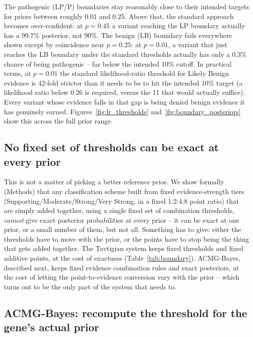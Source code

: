 \documentclass[11pt]{article}
\begin{document}
The pathogenic (LP/P) boundaries stay reasonably close to their intended
targets for priors between roughly 0.01 and 0.25. Above that, the standard
approach becomes over-confident: at $p=0.45$ a variant reaching the LP
boundary actually has a 99.7\% posterior, not 90\%. The benign (LB)
boundary fails everywhere shown except by coincidence near $p=0.25$: at
$p=0.01$, a variant that just reaches the LB boundary under the standard
thresholds actually has only a 0.3\% chance of being pathogenic -- far
below the intended 10\% cutoff. In practical terms, at $p=0.01$ the
standard likelihood-ratio threshold for Likely Benign evidence is 42-fold
stricter than it needs to be to hit the intended 10\% target (a likelihood
ratio below 0.26 is required, versus the 11 that would actually suffice).
Every variant whose evidence falls in that gap is being denied benign
evidence it has genuinely earned. Figures~\ref{fig:lr_thresholds}
and~\ref{fig:boundary_posteriors} show this across the full prior range.

\subsection*{No fixed set of thresholds can be exact at every prior}
\label{sec:results-trilemma}

This is not a matter of picking a better reference prior. We show formally
(Methods) that any classification scheme built from fixed evidence-strength
tiers (Supporting/Moderate/Strong/Very Strong, in a fixed 1:2:4:8 point
ratio) that are simply added together, using a single fixed set of
combination thresholds, \emph{cannot} give exact posterior probabilities at
every prior -- it can be exact at one prior, or a small number of them, but
not all. Something has to give: either the thresholds have to move with the
prior, or the points have to stop being the thing that gets added together.
The Tavtigian system keeps fixed thresholds and fixed additive points, at
the cost of exactness (Table~\ref{tab:boundary}). ACMG-Bayes, described
next, keeps fixed evidence combination rules and exact posteriors, at the
cost of letting the point-to-evidence conversion vary with the prior --
which turns out to be the only part of the system that needs to.

\subsection*{ACMG-Bayes: recompute the threshold for the gene's actual prior}
\label{sec:results-acmgbayes}
\end{document}
